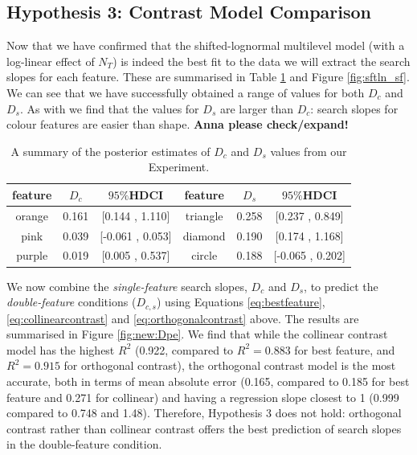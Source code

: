\documentclass[preprint,12pt,authoryear]{elsarticle}
\begin{document}
\subsection{Hypothesis 3: Contrast Model Comparison}

Now that we have confirmed that the shifted-lognormal multilevel model (with a log-linear effect of $N_T$) is indeed the best fit to the data we will extract the search slopes for each feature. These are summarised in Table \ref{tab:new_Dc_Ds} and Figure \ref{fig:sftln_sf}. We can see that we have successfully obtained a range of values for both $D_c$ and $D_s$. As with \cite{buetti2019predicting} we find that the values for $D_s$ are larger than $D_c$: search slopes for colour features are easier than shape. \textbf{Anna please check/expand!}

\begin{table}[h]
\centering
\begin{tabular}{|c|cc||c|cc|} 
\hline
feature & $D_c$ & $95\%$HDCI &feature &$D_s$  &$95\%$HDCI \\
 \hline 
orange & 0.161 &  [0.144 ,  1.110] & triangle  &  0.258  & [0.237  , 0.849]\\
pink  &  0.039 &  [-0.061 , 0.053] & diamond& 0.190 &  [0.174 ,  1.168]\\
purple & 0.019 &  [0.005  , 0.537] & circle & 0.188  & [-0.065 , 0.202]\\
 \hline 
 \end{tabular}
\caption{A summary of the posterior estimates of $D_c$ and $D_s$ values from our Experiment.}
\label{tab:new_Dc_Ds}
\end{table}

We now combine the \textit{single-feature} search slopes, $D_c$ and $D_s$, to predict the \textit{double-feature} conditions ($D_{c,s}$) using Equations \ref{eq:bestfeature}, \ref{eq:collinearcontrast} and \ref{eq:orthogonalcontrast} above. The results are summarised in Figure \ref{fig:new:Dpe}. We find that while the collinear contrast model has the highest $R^2$ (0.922, compared to $R^2=0.883$ for best feature, and $R^2=0.915$ for orthogonal contrast), the orthogonal contrast model is the most accurate, both in terms of mean absolute error (0.165, compared to 0.185 for best feature and 0.271 for collinear) and having a regression slope closest to 1 (0.999 compared to 0.748 and 1.48). Therefore, Hypothesis 3 does not hold: orthogonal contrast rather than collinear contrast offers the best prediction of search slopes in the double-feature condition.  
\end{document}
